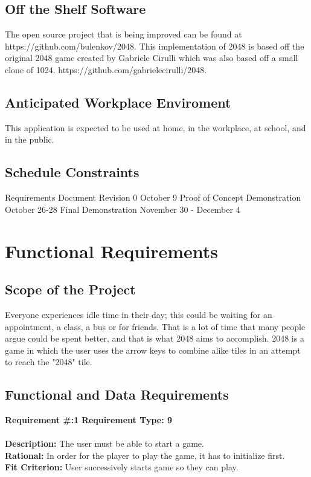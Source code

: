 \subsection{Off the Shelf Software}
\par\indent\indent The open source project that is being improved can be found
at \\ https://github.com/bulenkov/2048.
This implementation of 2048 is based off the original 2048 game created by 
Gabriele Cirulli which was also based off a small clone of 1024. 
https://github.com/gabrielecirulli/2048.
\subsection{Anticipated Workplace Enviroment}
This application is expected to be used at home, in the workplace, at school, and in the public.\newline
\subsection{Schedule Constraints}
Requirements Document Revision 0	\hfill	October 9 \newline
Proof of Concept Demonstration \hfill		October 26-28 \newline
Final Demonstration \hfill				November 30 - December 4 \newline

\section{Functional Requirements}
\subsection{Scope of the Project}
Everyone experiences idle time in their day; this could be waiting for an 
appointment, a class, a bus or for friends. That is a lot of time that many 
people argue could be spent better, and that is what 2048 aims to accomplish. 
2048 is a game in which the user uses the arrow keys to combine alike tiles in 
an attempt to reach the "2048" tile.\\

\subsection{Functional and Data Requirements}
\textbf {Requirement \#:1} \indent\textbf {Requirement Type: 9}\\\\
\textbf {Description:} The user must be able to start a game.\\
\textbf {Rational:} In order for the player to play the game, it has to initialize first.\\
\textbf {Fit Criterion:} User successively starts game so they can play. \\\\

